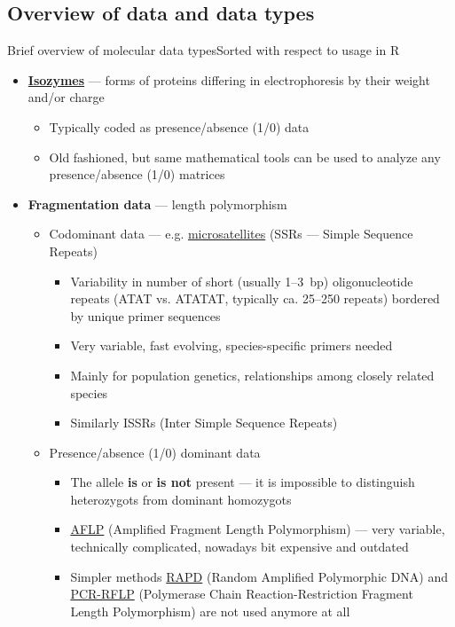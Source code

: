\documentclass[compress, ucs, xelatex, 11pt, xcolor=svgnames, aspectratio=169,
	hyperref={
		bookmarks=true,
		unicode=true,
		colorlinks=true,
		pdftitle={Molecular data in R},
		plainpages=false,
		pdfauthor={Vojtech Zeisek},
		pdfsubject={Course about phylogeny and evolution in R},
		pdfcreator={XeLaTeX},
		pdfkeywords={R, evolution, phylogeny, molecular data},
		linkcolor=Crimson, %
		anchorcolor=Magenta, %
		citecolor=Magenta, %
		filecolor=Magenta, %
		menucolor=Magenta, %
		urlcolor=DodgerBlue, %
		pdftex},
	url={hyphens, lowtilde} %
	]{beamer}
\begin{document}
\subsection[Overview]{Overview of data and data types}

\begin{frame}[allowframebreaks]{Brief overview of molecular data types}{Sorted with respect to usage in R}
	\begin{itemize}
		\item \textbf{\href{https://en.wikipedia.org/wiki/Isozyme}{Isozymes}} --- forms of proteins differing in electrophoresis by their weight and/or charge
		\begin{itemize}
			\item Typically coded as presence/absence (1/0) data
			\item Old fashioned, but same mathematical tools can be used to analyze any presence/absence (1/0) matrices
		\end{itemize}
		\item \textbf{Fragmentation data} --- length polymorphism
		\begin{itemize}
			\item Codominant data --- e.g. \href{https://en.wikipedia.org/wiki/Microsatellite}{microsatellites} (SSRs --- Simple Sequence Repeats)
			\begin{itemize}
				\item Variability in number of short (usually 1--3~bp) oligonucleotide repeats (ATAT vs. ATATAT, typically ca. 25--250 repeats) bordered by unique primer sequences
				\item Very variable, fast evolving, species-specific primers needed
				\item Mainly for population genetics, relationships among closely related species
				\item Similarly ISSRs (Inter Simple Sequence Repeats)
			\end{itemize}
			\item Presence/absence (1/0) dominant data
			\begin{itemize}
				\item The allele \textbf{is} or \textbf{is not} present  --- it is impossible to distinguish heterozygots from dominant homozygots
				\item \href{https://en.wikipedia.org/wiki/Amplified_fragment_length_polymorphism}{AFLP} (Amplified Fragment Length Polymorphism) --- very variable, technically complicated, nowadays bit expensive and outdated
				\item Simpler methods \href{https://en.wikipedia.org/wiki/RAPD}{RAPD} (Random Amplified Polymorphic DNA) and \href{https://en.wikipedia.org/wiki/Restriction_fragment_length_polymorphism}{PCR-RFLP} (Polymerase Chain Reaction-Restriction Fragment Length Polymorphism) are not used anymore at all

\end{itemize}
\end{itemize}
\end{itemize}
\end{frame}
\end{document}
